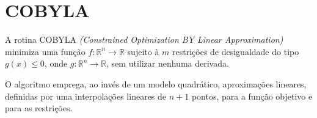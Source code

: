 %
%
%

\section{COBYLA} \label{cobyla}
A rotina COBYLA \emph{(Constrained Optimization BY Linear Approximation)}
minimiza uma função $f: \mathbb{R}^n \to \mathbb{R}$ sujeito à $m$ restrições de
desigualdade do tipo $g(x) \leq 0$, onde $g: \mathbb{R}^n \to \mathbb{R}$, sem
utilizar nenhuma derivada.

O algoritmo emprega, ao invés de um modelo quadrático, aproximações lineares,
definidas por uma interpolações lineares de $n+1$ pontos, para a função objetivo
e para as restrições.

% 
% 
